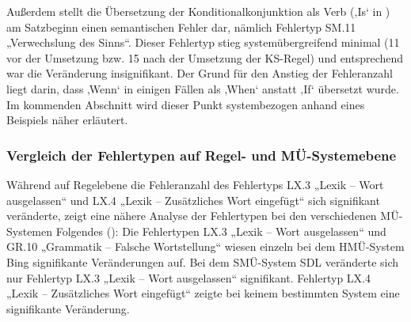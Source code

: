 Außerdem stellt die Übersetzung der Konditionalkonjunktion als Verb (‚Is‘ in ) am Satzbeginn einen semantischen Fehler dar, nämlich Fehlertyp SM.11 „Verwechslung des Sinns“. Dieser Fehlertyp stieg systemübergreifend minimal (11 vor der Umsetzung bzw. 15 nach der Umsetzung der KS-Regel) und entsprechend war die Veränderung insignifikant. Der Grund für den Anstieg der Fehleranzahl liegt darin, dass ‚Wenn‘ in einigen Fällen als ‚When‘ anstatt ‚If‘ übersetzt wurde. Im kommenden Abschnitt wird dieser Punkt systembezogen anhand eines Beispiels näher erläutert.

\subsubsection{Vergleich der Fehlertypen auf Regel- und MÜ-Systemebene}

Während auf Regelebene die Fehleranzahl des Fehlertyps LX.3 „Lexik -- Wort ausgelassen“  und LX.4 „Lexik -- Zusätzliches Wort eingefügt“ sich signifikant veränderte, zeigt eine nähere Analyse der Fehlertypen bei den verschiedenen MÜ-Systemen Folgendes (): Die Fehlertypen LX.3 „Lexik -- Wort ausgelassen“ und GR.10 „Grammatik -- Falsche Wortstellung“ wiesen einzeln bei dem HMÜ-System Bing signifikante Veränderungen auf. Bei dem SMÜ-System SDL veränderte sich nur Fehlertyp LX.3 „Lexik -- Wort ausgelassen“ signifikant. Fehlertyp LX.4 „Lexik -- Zusätzliches Wort eingefügt“ zeigte bei keinem bestimmten System eine signifikante Veränderung.


